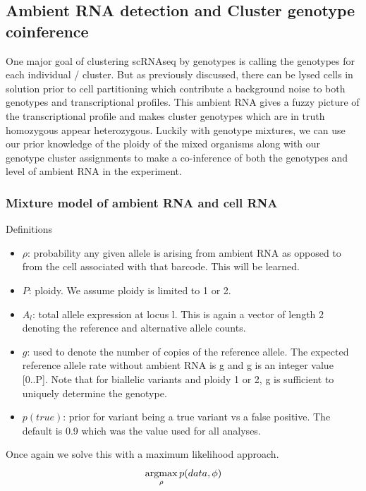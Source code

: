 \subsection{Ambient RNA detection and Cluster genotype coinference}
One major goal of clustering scRNAseq by genotypes is calling the genotypes for each individual / cluster.
But as previously discussed, there can be lysed cells in solution prior to cell partitioning which contribute a background noise to both genotypes and transcriptional profiles. 
This ambient RNA gives a fuzzy picture of the transcriptional profile and makes cluster genotypes which are in truth homozygous appear heterozygous. 
Luckily with genotype mixtures, we can use our prior knowledge of the ploidy of the mixed organisms along with our genotype cluster assignments to 
make a co-inference of both the genotypes and level of ambient RNA in the experiment.

\subsubsection{Mixture model of ambient RNA and cell RNA}
Definitions
\begin{itemize}
\item $\rho$: probability any given allele is arising from ambient RNA as opposed to from the cell associated with that barcode. This will be learned.
\item $P$: ploidy. We assume ploidy is limited to 1 or 2.
\item $A_l$: total allele expression at locus l. This is again a vector of length 2 denoting the reference and alternative allele counts.
\item $g$: used to denote the number of copies of the reference allele. The expected reference allele rate without ambient RNA is g and g is an integer value [0..P]. Note that for biallelic variants and ploidy 1 or 2, g is sufficient to uniquely determine the genotype. 
\item $p(true)$: prior for variant being a true variant vs a false positive. The default is 0.9 which was the value used for all analyses.
\end{itemize}


Once again we solve this with a maximum likelihood approach.
\begin{equation}
\operatorname*{argmax}_{\rho} p(data, \phi)
\end{equation}

